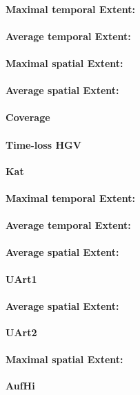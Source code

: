 \paragraph{Maximal temporal Extent:}
\paragraph{Average temporal Extent:}
\paragraph{Maximal spatial Extent:}
\paragraph{Average spatial Extent:}
\paragraph{Coverage}
\paragraph{Time-loss HGV}

\large
\centerline{\textbf{Kat}}
\normalsize

\paragraph{Maximal temporal Extent:}
\paragraph{Average temporal Extent:}
\paragraph{Average spatial Extent:}

\large
\centerline{\textbf{UArt1}}
\normalsize

\paragraph{Average spatial Extent:}

\large
\centerline{\textbf{UArt2}}
\normalsize

\paragraph{Maximal spatial Extent:}

\large
\centerline{\textbf{AufHi}}
\normalsize

